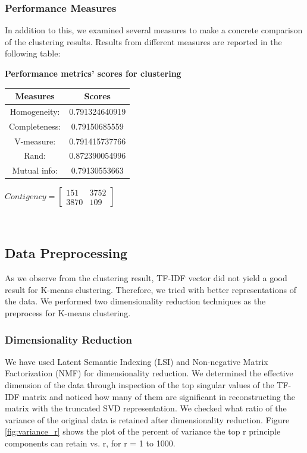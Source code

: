 \documentclass{report}
\begin{document}
\subsubsection*{Performance Measures}
In addition to this, we examined several measures to make a concrete comparison of the clustering results. Results from different measures are reported in the following table: 

\begin{center}
	\textbf{Performance metrics' scores for clustering} \\ \vspace{10pt}	
	\begin{tabular}{*{2}{c}}
		\toprule
		\textbf{Measures} & \textbf{Scores}  \\
		\midrule
		Homogeneity: & 0.791324640919  \\
		\midrule
		Completeness: & 0.79150685559   \\
		\midrule
		V-measure: & 0.791415737766   \\
		\midrule
		Rand: & 0.872390054996   \\
		\hmidrule
		Mutual info: & 0.79130553663  \\
		\bottomrule
	\end{tabular}
	\qquad
	$Contigency = \left[\begin{array}{*{2}{c}}
    				151 & 3752 \\
     				3870 & 109
					\end{array}\right]
					$
\end{center}    

\\  \vspace{20pt}



\subsection*{Data Preprocessing}
As we observe from the clustering result, TF\--IDF vector did not yield a good result for K-means clustering. Therefore, we tried with better representations of the data. We performed two dimensionality reduction techniques as the preprocess for K-means clustering. \\ \vspace{10pt}


\subsubsection{Dimensionality Reduction}
We have used Latent Semantic Indexing (LSI) and Non-negative Matrix Factorization (NMF) for dimensionality reduction. 
We determined the effective dimension of the data through inspection of the top singular values of the TF\--IDF matrix and noticed how many of them are significant in reconstructing the matrix with the truncated SVD representation. We checked what ratio of the variance of the original data is retained after dimensionality reduction. Figure \ref{fig:variance_r} shows the plot of the percent of variance the top r principle components can retain vs. r, for r = 1 to 1000.
\end{document}

